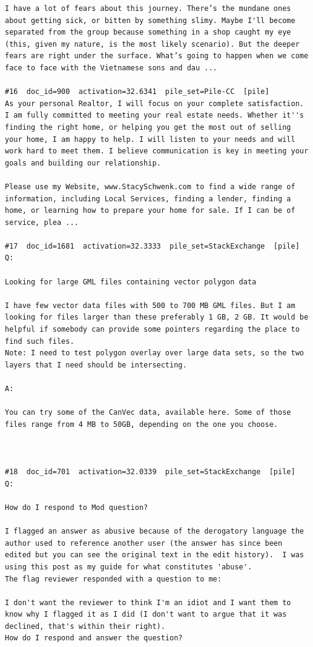 \begin{verbatim}
I have a lot of fears about this journey. There’s the mundane ones about getting sick, or bitten by something slimy. Maybe I'll become separated from the group because something in a shop caught my eye (this, given my nature, is the most likely scenario). But the deeper fears are right under the surface. What’s going to happen when we come face to face with the Vietnamese sons and dau ...

#16  doc_id=900  activation=32.6341  pile_set=Pile-CC  [pile]
As your personal Realtor, I will focus on your complete satisfaction. I am fully committed to meeting your real estate needs. Whether it''s finding the right home, or helping you get the most out of selling your home, I am happy to help. I will listen to your needs and will work hard to meet them. I believe communication is key in meeting your goals and building our relationship.

Please use my Website, www.StacySchwenk.com to find a wide range of information, including Local Services, finding a lender, finding a home, or learning how to prepare your home for sale. If I can be of service, plea ...

#17  doc_id=1681  activation=32.3333  pile_set=StackExchange  [pile]
Q:

Looking for large GML files containing vector polygon data

I have few vector data files with 500 to 700 MB GML files. But I am looking for files larger than these preferably 1 GB, 2 GB. It would be helpful if somebody can provide some pointers regarding the place to find such files.
Note: I need to test polygon overlay over large data sets, so the two layers that I need should be intersecting.

A:

You can try some of the CanVec data, available here. Some of those files range from 4 MB to 50GB, depending on the one you choose.



#18  doc_id=701  activation=32.0339  pile_set=StackExchange  [pile]
Q:

How do I respond to Mod question?

I flagged an answer as abusive because of the derogatory language the author used to reference another user (the answer has since been edited but you can see the original text in the edit history).  I was using this post as my guide for what constitutes 'abuse'.
The flag reviewer responded with a question to me:

I don't want the reviewer to think I'm an idiot and I want them to know why I flagged it as I did (I don't want to argue that it was declined, that's within their right).
How do I respond and answer the question?


\end{verbatim}
